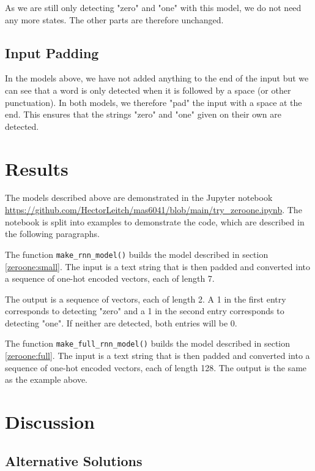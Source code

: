 \documentclass{somasmsc}
\begin{document}
As we are still only detecting "zero" and "one" with this model, we do not need any more states. The other parts are therefore unchanged.

\subsection{Input Padding}

In the models above, we have not added anything to the end of the input but we can see that a word is only detected when it is followed by a space (or other punctuation). In both models, we therefore "pad" the input with a space at the end. This ensures that the strings "zero" and "one" given on their own are detected.


\section{Results}

The models described above are demonstrated in the Jupyter notebook \url{https://github.com/HectorLeitch/mas6041/blob/main/try_zeroone.ipynb}. The notebook is split into examples to demonstrate the code, which are described in the following paragraphs.

\begin{exa}
The function \verb|make_rnn_model()| builds the model described in section \ref{zeroone:small}. The input is a text string that is then padded and converted into a sequence of one-hot encoded vectors, each of length 7.

The output is a sequence of vectors, each of length 2. A 1 in the first entry corresponds to detecting "zero" and a 1 in the second entry corresponds to detecting "one". If neither are detected, both entries will be 0.
\end{exa}

\begin{exa}
The function \verb|make_full_rnn_model()| builds the model described in section \ref{zeroone:full}. The input is a text string that is then padded and converted into a sequence of one-hot encoded vectors, each of length 128. The output is the same as the example above.
\end{exa}

\section{Discussion}

\subsection{Alternative Solutions}
\end{document}
